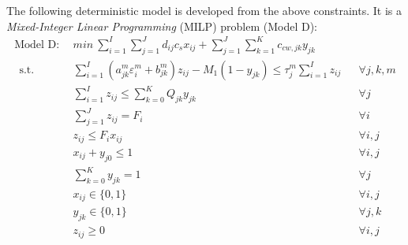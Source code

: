 \documentclass[preprint,12pt,authoryear]{elsarticle}
\renewcommand{\theequation}{\thesection--\arabic{equation}}
\begin{document}

The following deterministic model is developed from the above constraints. It is a \emph{Mixed-Integer Linear Programming} (MILP) problem (Model D):
\setcounter{equation}{0}
\begin{align}\label{model:D}
	\text{Model D}:~~&min ~ \sum_{i=1}^{I}\sum_{j=1}^{J}d_{ij}c_s x_{ij} + \sum_{j=1}^{J}\sum_{k=1}^{K}c_{cw,jk}y_{jk}\nonumber\\~~
	\mbox{s.t.}~~
	&\sum_{i=1}^{I} (a_{jk}^m \varepsilon_i^m + b_{jk}^m) z_{ij} - M_1(1 - y_{jk}) \leq \tau_j^m \sum_{i=1}^I z_{ij}  && \forall j,k,m\\
 	&\sum_{i=1}^{I} z_{ij} \leq \sum_{k=0}^K Q_{jk} y_{jk} && \forall j\\
	&\sum_{j=1}^J z_{ij} = F_i && \forall i\\
	&z_{ij} \leq F_i x_{ij} && \forall i,j\\
	&x_{ij} + y_{j0} \leq 1 && \forall i,j\\
	&\sum_{k=0}^{K}y_{jk} = 1&&\forall j\\
	&x_{ij} \in \{0,1\}&&\forall i,j\\
	&y_{jk} \in \{0,1\}&&\forall j,k\\
	&z_{ij} \geq 0&&\forall i,j
\end{align}
\renewcommand{\theequation}{\thesection--\arabic{equation}}
\end{document}
